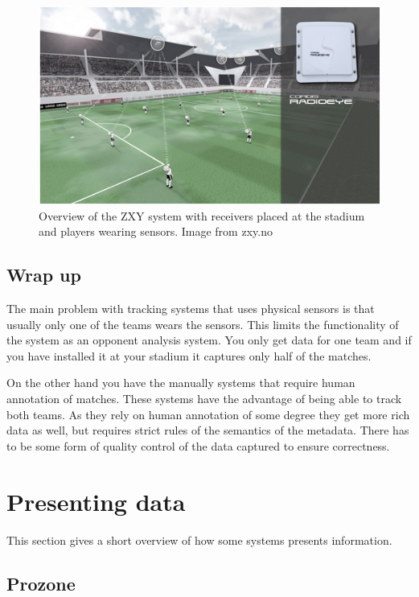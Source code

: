 \begin{figure}[ht!]
\centering
\includegraphics[width=1\textwidth]{images/general/zxyoverview.png}
\caption{Overview of the ZXY system with receivers placed at the stadium and players wearing sensors. Image from zxy.no}
\label{fig:zxycam}
\end{figure}

\subsection{Wrap up}
The main problem with tracking systems that uses physical sensors is that usually only one of the teams wears the sensors. This limits the functionality of the system as an opponent analysis system. You only get data for one team and if you have installed it at your stadium it captures only half of the matches. 

On the other hand you have the manually systems that require human annotation of matches. These systems have the advantage of being able to track both teams. As they rely on human annotation of some degree they get more rich data as well, but requires strict rules of the semantics of the metadata. There has to be some form of quality control of the data captured to ensure correctness. 

\section{Presenting data}

This section gives a short overview of how some systems presents information.

\subsection{Prozone}

